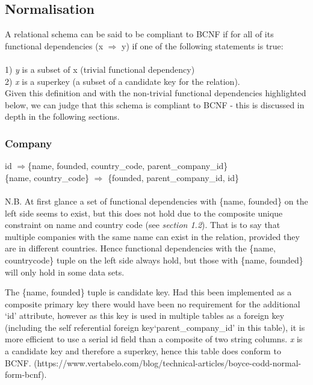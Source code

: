 \documentclass[12pt]{article}
\begin{document}
\subsection{Normalisation}
A relational schema can be said to be compliant to BCNF if for all of its functional dependencies (x $\Rightarrow$ y) if one of the following statements is true: \\\\
1) \emph{y} is a subset of x (trivial functional dependency) \\
2) \emph{x} is a superkey (a subset of a candidate key for the relation). \\
Given this definition and with the non-trivial functional dependencies highlighted below, we can judge that this schema is compliant to BCNF - this is discussed in depth in the following sections.

\subsubsection{Company}

id $\Rightarrow${\{name, founded, country\_code, parent\_company\_id\}} \\
\{{name, country\_code\}} $\Rightarrow$ {\{founded, parent\_company\_id, id\}} \\

\\ N.B. At first glance a set of functional dependencies with \{{name,  founded}\} on the left side seems to exist, but this does not hold due to the composite unique constraint on name and country code (see \emph{section 1.2}).  That is to say that multiple companies with the same name can exist in the relation, provided they are in different countries. Hence functional dependencies with the \{{name, countrycode\}} tuple on the left side always hold, but those with \{{name, founded\}} will only hold in some data sets.

The \{{name, founded\}} tuple is candidate key. Had this been implemented as a composite primary key there would have been no requirement for the additional `id' attribute, however as this key is used in multiple tables as a foreign key (including the self referential foreign key`parent\_company\_id' in this table), it is more efficient to use a serial id field than a composite of two string columns. \emph{x} is a candidate key and therefore a superkey, hence this table does conform to BCNF. (https://www.vertabelo.com/blog/technical-articles/boyce-codd-normal-form-bcnf).
\end{document}
